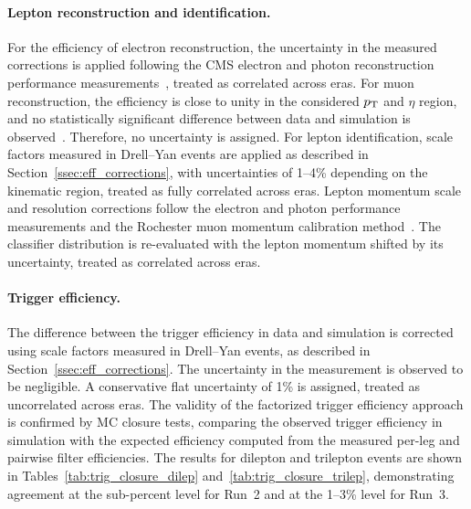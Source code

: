 \paragraph{Lepton reconstruction and identification.}
For the efficiency of electron reconstruction, the uncertainty in the measured corrections is applied following the CMS electron and photon reconstruction performance measurements~\cite{CMS:2020uim}, treated as correlated across eras. For muon reconstruction, the efficiency is close to unity in the considered $p_{\mathrm{T}}$ and $\eta$ region, and no statistically significant difference between data and simulation is observed~\cite{CMS:2018rym}. Therefore, no uncertainty is assigned. For lepton identification, scale factors measured in Drell--Yan events are applied as described in Section~\ref{ssec:eff_corrections}, with uncertainties of 1--4\% depending on the kinematic region, treated as fully correlated across eras. Lepton momentum scale and resolution corrections follow the electron and photon performance measurements and the Rochester muon momentum calibration method~\cite{CMS:2020uim,Bodek:2012id}. The classifier distribution is re-evaluated with the lepton momentum shifted by its uncertainty, treated as correlated across eras.

\paragraph{Trigger efficiency.}
The difference between the trigger efficiency in data and simulation is corrected using scale factors measured in Drell--Yan events, as described in Section~\ref{ssec:eff_corrections}. The uncertainty in the measurement is observed to be negligible. A conservative flat uncertainty of 1\% is assigned, treated as uncorrelated across eras. The validity of the factorized trigger efficiency approach is confirmed by MC closure tests, comparing the observed trigger efficiency in simulation with the expected efficiency computed from the measured per-leg and pairwise filter efficiencies. The results for dilepton and trilepton events are shown in Tables~\ref{tab:trig_closure_dilep} and~\ref{tab:trig_closure_trilep}, demonstrating agreement at the sub-percent level for Run~2 and at the 1--3\% level for Run~3.

